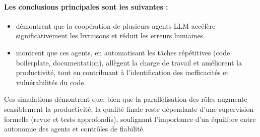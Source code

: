 \paragraph{Les conclusions principales sont les suivantes :}
\begin{itemize}
  \item \textcite{ashraf_autonomous_2025} démontrent que la coopération de plusieurs agents LLM accélère significativement les livraisons et réduit les erreurs humaines.
  \item \textcite{zahid_multi-agent_2024} montrent que ces agents, en automatisant les tâches répétitives (code boilerplate, documentation), allègent la charge de travail et améliorent la productivité, tout en contribuant à l’identification des inefficacités et vulnérabilités du code.
\end{itemize}

Ces simulations démontrent que, bien que la parallélisation des rôles augmente sensiblement la productivité, la qualité finale reste dépendante d’une supervision formelle (revue et tests approfondis), soulignant l’importance d’un équilibre entre autonomie des agents et contrôles de fiabilité.  





